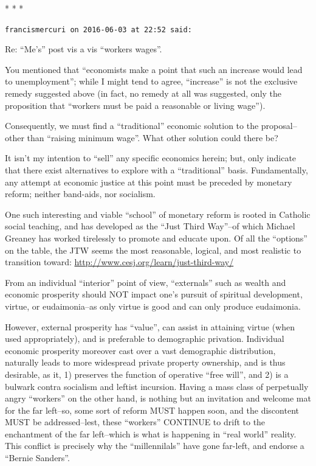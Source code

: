 
\begin{center}* * *\end{center}

\begin{footnotesize}
\begin{sffamily}

\texttt{francismercuri on 2016-06-03 at 22:52 said:}

Re: ``Me's'' post vis a vis ``workers wages''.

You mentioned that ``economists make a point that such an increase would lead to unemployment''; while I might tend to agree, ``increase'' is not the exclusive remedy suggested above (in fact, no remedy at all was suggested, only the proposition that ``workers must be paid a reasonable or living wage'').

Consequently, we must find a ``traditional'' economic solution to the proposal--other than ``raising minimum wage''. What other solution could there be?

It isn't my intention to ``sell'' any specific economics herein; but, only indicate that there exist alternatives to explore with a ``traditional'' basis. Fundamentally, any attempt at economic justice at this point must be preceded by monetary reform; neither band-aids, nor socialism.

One such interesting and viable ``school'' of monetary reform is rooted in Catholic social teaching, and has developed as the ``Just Third Way''--of which Michael Greaney has worked tirelessly to promote and educate upon. Of all the ``options'' on the table, the JTW seems the most reasonable, logical, and most realistic to transition toward:
\url{http://www.cesj.org/learn/just-third-way/}


From an individual ``interior'' point of view, ``externals'' such as wealth and economic prosperity should NOT impact one's pursuit of spiritual development, virtue, or eudaimonia--as only virtue is good and can only produce eudaimonia.

However, external prosperity has ``value'', can assist in attaining virtue (when used appropriately), and is preferable to demographic privation. Individual economic prosperity moreover cast over a vast demographic distribution, naturally leads to more widespread private property ownership, and is thus desirable, as it, 1) preserves the function of operative ``free will'', and 2) is a bulwark contra socialism and leftist incursion. Having a mass class of perpetually angry ``workers'' on the other hand, is nothing but an invitation and welcome mat for the far left--so, some sort of reform MUST happen soon, and the discontent MUST be addressed--lest, these ``workers'' CONTINUE to drift to the enchantment of the far left--which is what is happening in ``real world'' reality. This conflict is precisely why the ``millennilals'' have gone far-left, and endorse a ``Bernie Sanders''.


\end{sffamily}
\end{footnotesize}
